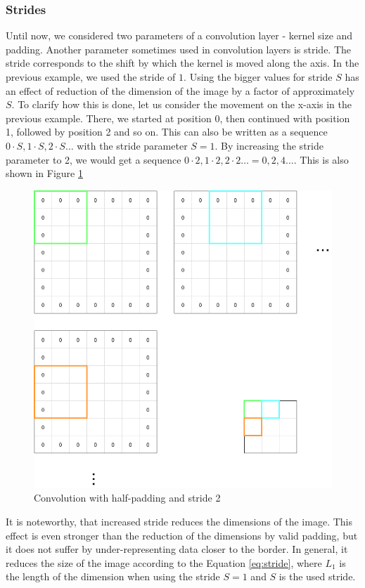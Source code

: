 \subsubsection{Strides}
Until now, we considered two parameters of a convolution layer - kernel size and padding.
Another parameter sometimes used in convolution layers is stride.
The stride corresponds to the shift by which the kernel is moved along the axis.
In the previous example, we used the stride of $1$.
Using the bigger values for stride $S$ has an effect of reduction of the dimension of the image by a factor of approximately $S$. 
To clarify how this is done, let us consider the movement on the x-axis in the previous example.
There, we started at position 0, then continued with position 1, followed by position 2 and so on.
This can also be written as a sequence $0\cdot S, 1\cdot S, 2\cdot S\dots$ with the stride parameter $S = 1$.
By increasing the stride parameter to 2, we would get a sequence $0\cdot2, 1\cdot2, 2\cdot2\dots = 0, 2, 4\dots$.
This is also shown in Figure \ref{fig:stride}

\begin{figure}
    \centering
    \includegraphics[width=0.6\linewidth]{imgs_andy/stride.png}
    \caption{Convolution with half-padding and stride 2}
    \label{fig:stride}
\end{figure}

It is noteworthy, that increased stride reduces the dimensions of the image.
This effect is even stronger than the reduction of the dimensions by valid padding, but it does not suffer by under-representing data closer to the border.
In general, it reduces the size of the image according to the Equation \ref{eq:stride}, where $L_1$ is the length of the dimension when using the stride $S=1$ and $S$ is the used stride.

